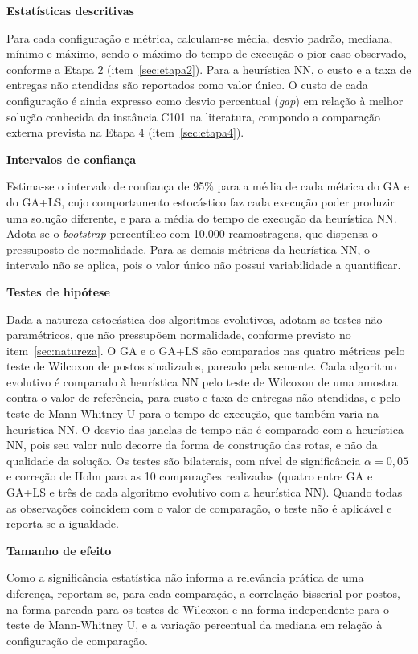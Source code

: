 \begin{alineas}
	\item \textbf{Estatísticas descritivas}

	Para cada configuração e métrica, calculam-se média, desvio padrão, mediana, mínimo e
	máximo, sendo o máximo do tempo de execução o pior caso observado, conforme a Etapa 2
	(item~\ref{sec:etapa2}). Para a heurística NN, o custo e a taxa de entregas não
	atendidas são reportados como valor único. O custo de cada configuração é ainda
	expresso como desvio percentual (\textit{gap}) em relação à melhor solução conhecida da
	instância C101 na literatura, compondo a comparação externa prevista na Etapa 4
	(item~\ref{sec:etapa4}).

	\item \textbf{Intervalos de confiança}

	Estima-se o intervalo de confiança de 95\% para a média de cada métrica do GA e do
	GA+LS, cujo comportamento estocástico faz cada execução poder produzir uma solução
	diferente, e para a média do tempo de execução da heurística NN. Adota-se o
	\textit{bootstrap} percentílico com 10.000 reamostragens, que dispensa o pressuposto de
	normalidade. Para as demais métricas da heurística NN, o intervalo não se aplica, pois
	o valor único não possui variabilidade a quantificar.

	\item \textbf{Testes de hipótese}

	Dada a natureza estocástica dos algoritmos evolutivos, adotam-se testes
	não-paramétricos, que não pressupõem normalidade, conforme previsto no
	item~\ref{sec:natureza}. O GA e o GA+LS são comparados nas quatro métricas pelo teste
	de Wilcoxon de postos sinalizados, pareado pela semente. Cada algoritmo evolutivo é
	comparado à heurística NN pelo teste de Wilcoxon de uma amostra contra o valor de
	referência, para custo e taxa de entregas não atendidas, e pelo teste de Mann-Whitney U
	para o tempo de execução, que também varia na heurística NN. O desvio das janelas de
	tempo não é comparado com a heurística NN, pois seu valor nulo decorre da forma de
	construção das rotas, e não da qualidade da solução. Os testes são bilaterais, com
	nível de significância $\alpha = 0{,}05$ e correção de Holm para as 10 comparações
	realizadas (quatro entre GA e GA+LS e três de cada algoritmo evolutivo com a heurística
	NN). Quando todas as observações coincidem com o valor de comparação, o teste não é
	aplicável e reporta-se a igualdade.

	\item \textbf{Tamanho de efeito}

	Como a significância estatística não informa a relevância prática de uma diferença,
	reportam-se, para cada comparação, a correlação bisserial por postos, na forma pareada
	para os testes de Wilcoxon e na forma independente para o teste de Mann-Whitney U, e a
	variação percentual da mediana em relação à configuração de comparação.
\end{alineas}

